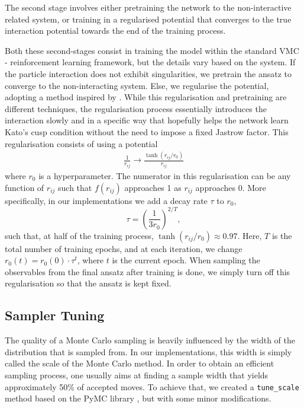 The second stage involves either pretraining the network to the non-interactive related system, or training in a regularised potential that converges to the true interaction potential towards the end of the training process.

Both these second-stages consist in training the model within the standard VMC - reinforcement learning framework, but the details vary based on the system. If the particle interaction does not exhibit singularities, we pretrain the ansatz to converge to the non-interacting system. Else, we regularise the potential, adopting a method inspired by \cite{jane}.
While this regularisation and pretraining are different techniques, the regularisation process essentially introduces the interaction slowly and in a specific way that hopefully helps the network learn Kato's cusp condition without the need to impose a fixed Jastrow factor. This regularisation consists of using a potential
\begin{align*}
    \frac{1}{r_{ij}} \to \frac{\tanh(r_{ij}/r_0)}{r_{ij}}
\end{align*}
where $r_0$ is a hyperparameter. The numerator in this regularisation can be any function of $r_{ij}$ such that $f(r_{ij})$ approaches 1 as $r_{ij}$ approaches 0. 
More specifically, in our implementations we add a decay rate $\tau$ to $r_0$,
\begin{equation}
    \tau = \left(\frac{1}{3 r_0}\right)^{2/T},
\end{equation}
such that, at half of the training process, $\tanh(r_{ij}/r_0) \approx 0.97$. Here, $T$ is the total number of training epochs, and at each iteration, we change $r_0(t) = r_0(0)\cdot\tau^t$, where $t$ is the current epoch. When sampling the observables from the final ansatz after training is done, we simply turn off this regularisation so that the ansatz is kept fixed.

\subsection{Sampler Tuning}

The quality of a Monte Carlo sampling is heavily influenced by the width of the distribution that is sampled from. In our implementations, this width is simply called the scale of the Monte Carlo method. In order to obtain an efficient sampling process, one usually aims at finding a sample width that yields approximately 50\% of accepted moves. To achieve that, we created a \verb|tune_scale| method based on the PyMC library \cite{pymc2023}, but with some minor modifications.

